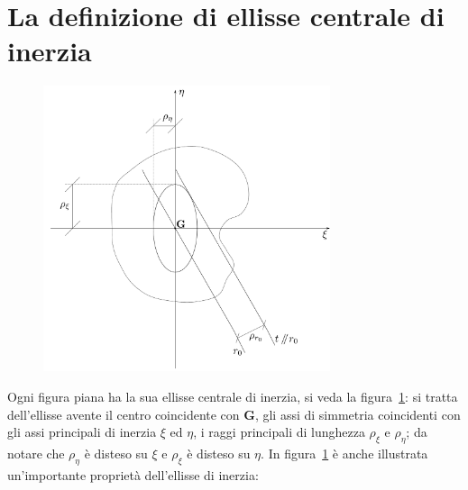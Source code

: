\section{La definizione di ellisse centrale di inerzia}
\renewcommand{\thefigure}{6~-~1}
\begin{figure}[h]
\centering
\includegraphics[width=0.75\textwidth]{Immagini/Parte_6/Figura6_1/Figura6_1.pdf}
\caption{}
\label{figura6-1}
\end{figure}
Ogni figura piana ha la sua ellisse centrale di inerzia, si veda la figura~\ref{figura6-1}: si tratta dell'ellisse avente il centro coincidente con $\mathbf{G}$, gli assi di simmetria coincidenti con gli assi principali di inerzia $\xi$ ed $\eta$, i raggi principali di lunghezza $\rho_{\xi}$ e $\rho_{\eta}$; da notare che $\rho_{\eta}$ è disteso su $\xi$ e $\rho_{\xi}$ è disteso su $\eta$. In figura~\ref{figura6-1} è anche illustrata un'importante proprietà dell'ellisse di inerzia:
\\

